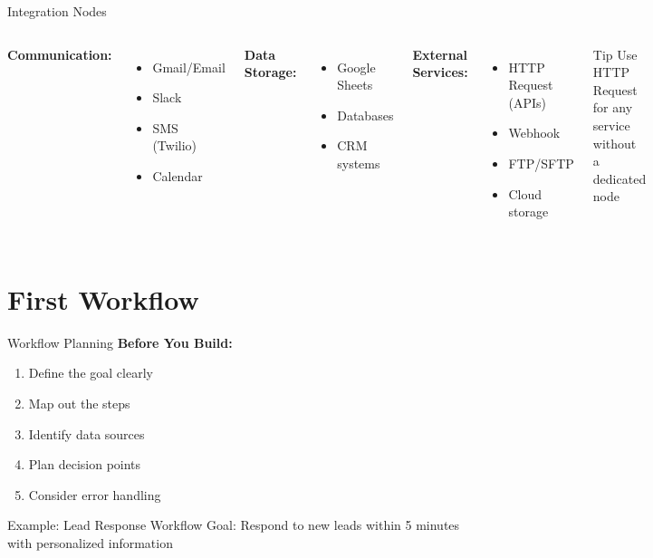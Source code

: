 \documentclass{beamer}
\begin{document}
\begin{frame}{Integration Nodes}
  \begin{columns}[onlytextwidth]
      \textbf{Communication:}
      \begin{itemize}
        \item Gmail/Email
        \item Slack
        \item SMS (Twilio)
        \item Calendar
      \end{itemize}
      
      \textbf{Data Storage:}
      \begin{itemize}
        \item Google Sheets
        \item Databases
        \item CRM systems
      \end{itemize}
    
      \textbf{External Services:}
      \begin{itemize}
        \item HTTP Request (APIs)
        \item Webhook
        \item FTP/SFTP
        \item Cloud storage
      \end{itemize}
      
      \begin{block}{Tip}
        Use HTTP Request for any service without a dedicated node
      \end{block}
  \end{columns}
\end{frame}

\section{First Workflow}

\begin{frame}{Workflow Planning}
  \textbf{Before You Build:}
  \begin{enumerate}
    \item Define the goal clearly
    \item Map out the steps
    \item Identify data sources
    \item Plan decision points
    \item Consider error handling
  \end{enumerate}
  
  \vspace{0.3cm}
  
  \begin{block}{Example: Lead Response Workflow}
    Goal: Respond to new leads within 5 minutes with personalized information
  \end{block}
\end{frame}
\end{document}
